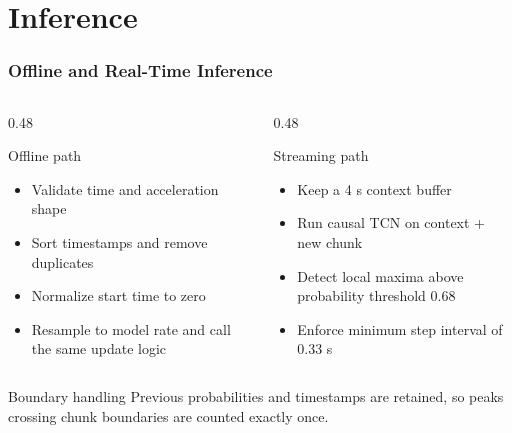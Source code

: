 \section{Inference}

\begin{frame}
    \frametitle{Offline and Real-Time Inference}
    \small
    \begin{columns}[t]
        \begin{column}{0.48\textwidth}
            \begin{block}{Offline path}
                \begin{itemize}
                    \item Validate time and acceleration shape
                    \item Sort timestamps and remove duplicates
                    \item Normalize start time to zero
                    \item Resample to model rate and call the same update logic
                \end{itemize}
            \end{block}
        \end{column}
        \begin{column}{0.48\textwidth}
            \begin{block}{Streaming path}
                \begin{itemize}
                    \item Keep a 4 s context buffer
                    \item Run causal TCN on context + new chunk
                    \item Detect local maxima above probability threshold 0.68
                    \item Enforce minimum step interval of 0.33 s
                \end{itemize}
            \end{block}
        \end{column}
    \end{columns}

    \begin{alertblock}{Boundary handling}
        Previous probabilities and timestamps are retained, so peaks crossing chunk boundaries are counted exactly once.
    \end{alertblock}
\end{frame}